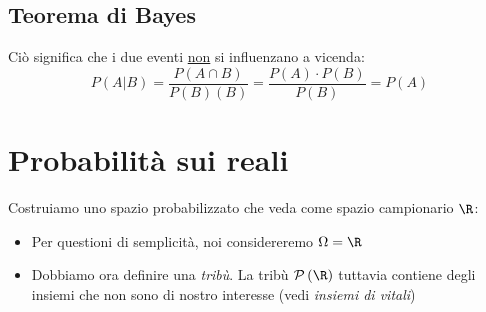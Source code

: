 \subsection{Teorema di Bayes}
Ciò significa che i due eventi \underline{non} si influenzano a vicenda:
\[
	P\left(A|B\right)= \frac{P\left(A \cap  B\right)}{P(B)\left(B\right)} = \frac{P (A) \cdot P\left(B\right) }{P\left(B\right)} = P\left(A\right)
\]
\section{Probabilità sui reali}
Costruiamo uno spazio probabilizzato che veda come spazio campionario $ \R  $:
\begin{itemize}
	\item Per questioni di semplicità, noi considereremo $ \Omega = \R $
	\item Dobbiamo ora definire una \textit{tribù}. La tribù $ \mathcal{P}\left(\R \right) $ tuttavia contiene degli insiemi che non sono di nostro interesse (vedi \textit{insiemi di vitali})
\end{itemize}
